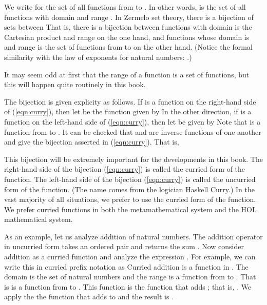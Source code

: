 \documentclass[cup9a]{cupbook}
\begin{document}
We write  for the set of all functions from  to .  In other
words,  is the set of all functions with domain  and range .
In Zermelo set theory, there is a bijection of sets between
That is, there is a bijection between functions with domain is the Cartesian product  and range  on the one hand, and functions whose domain is  and range is the set of functions from  to  on the other hand.
(Notice the formal similarity with the law of exponents for natural numbers:
.)

It may seem odd at first that the range of a function is a set of functions, but this will happen quite routinely in this book.

The bijection is given explicity as follows.  If  is a function
on the right-hand side of (\ref{eqn:curry}), then let 
be the function given by 
In the other direction, if  is a function on the left-hand side of (\ref{eqn:curry}), then let  be given by
Note that  is a function from  to .
It can be  checked that  and  are inverse functions of one another and give the bijection asserted in (\ref{eqn:curry}).
That is,

This bijection will be extremely important for the developments in this book.  The right-hand side of the bijection (\ref{eqn:curry}) is called the curried form of the function.  The left-hand side of the bijection (\ref{eqn:curry}) is called the uncurried form of the function.  (The name comes from the logician Haskell Curry.)   In the vast majority of all situations, we prefer to use the curried form of the function.  We prefer curried functions in both the metamathematical system and the HOL mathematical system.

As an example, let us analyze addition of natural numbers.  The addition operator in uncurried form takes an ordered pair  and
returns the sum .   Now consider addition as a curried function and analyze the expression .  For example, we can write this in curried prefix notation as
Curried addition is a function in .  The domain
is the set of natural numbers and the range is a function from  to .
That is  is a function from  to .  This function is the function that adds ; that is, .  We apply the
the function that adds  to  and the result is .
\end{document}
